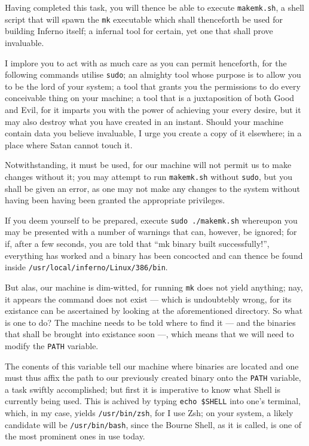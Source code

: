\documentclass[a4paper,12pt]{report}
\begin{document}
  Having completed this task, you will thence be able to execute \texttt{makemk.sh}, a shell script that will spawn the \texttt{mk} executable which shall thenceforth be used for building Inferno itself; a infernal tool for certain, yet one that shall prove invaluable.

  I implore you to act with as much care as you can permit henceforth, for the following commands utilise \texttt{sudo}; an almighty tool whose purpose is to allow you to be the lord of your system; a tool that grants you the permissions to do every conceivable thing on your machine; a tool that is a juxtaposition of both Good and Evil, for it imparts you with the power of achieving your every desire, but it may also destroy what you have created in an instant. Should your machine contain data you believe invaluable, I urge you create a copy of it elsewhere; in a place where Satan cannot touch it.

  Notwithstanding, it must be used, for our machine will not permit us to make changes without it; you may attempt to run \texttt{makemk.sh} without \texttt{sudo}, but you shall be given an error, as one may not make any changes to the system without having been having been granted the appropriate privileges.

  If you deem yourself to be prepared, execute \texttt{sudo ./makemk.sh} whereupon you may be presented with a number of warnings that can, however, be ignored; for if, after a few seconds, you are told that ``mk binary built successfully!'', everything has worked and a binary has been concocted and can thence be found inside \texttt{/usr/local/inferno/Linux/386/bin}.

  But alas, our machine is dim-witted, for running \texttt{mk} does not yield anything; nay, it appears the command does not exist — which is undoubtebly wrong, for its existance can be ascertained by looking at the aforementioned directory. So what is one to do? The machine needs to be told where to find it — and the binaries that shall be brought into existance soon —, which means that we will need to modify the \texttt{PATH} variable.

  The conents of this variable tell our machine where binaries are located and one must thus affix the path to our previously created binary onto the \texttt{PATH} variable, a task swiftly accomplished; but first it is imperative to know what Shell is currently being used. This is achived by typing \texttt{echo \$SHELL} into one's terminal, which, in my case, yields \texttt{/usr/bin/zsh}, for I use Zsh; on your system, a likely candidate will be \texttt{/usr/bin/bash}, since the Bourne Shell, as it is called, is one of the most prominent ones in use today.
\end{document}

